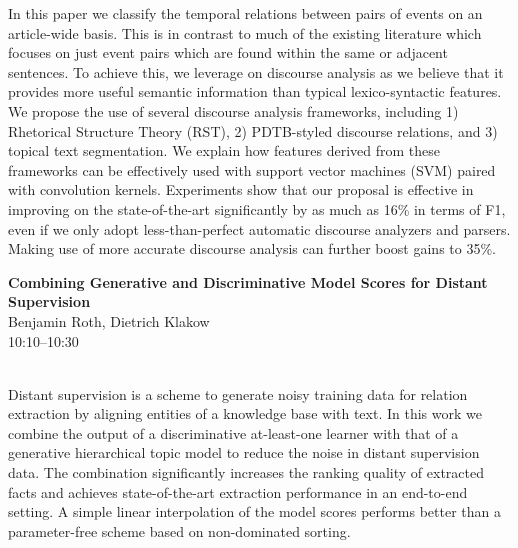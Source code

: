 \documentclass[twoside,makeidx]{book}
\begin{document}
\nopagebreak%
\noindent%
{\small In this paper we classify the temporal relations between pairs of events on an article-wide basis. This is in contrast to much of the existing literature which focuses on just event pairs which are found within the same or adjacent sentences. To achieve this, we leverage on discourse analysis as we believe that it provides more useful semantic information than typical lexico-syntactic features. We propose the use of several discourse analysis frameworks, including 1) Rhetorical Structure Theory (RST), 2) PDTB-styled discourse relations, and 3) topical text segmentation. We explain how features derived from these frameworks can be effectively used with support vector machines (SVM) paired with convolution kernels. Experiments show that our proposal is effective in improving on the state-of-the-art significantly by as much as 16\% in terms of F1, even if we only adopt less-than-perfect automatic discourse analyzers and parsers. Making use of more accurate discourse analysis can further boost gains to 35\%.}
\par\vspace{2em}\noindent%
\begin{minipage}{\linewidth}%
\begin{center}
\textbf{\normalsize Combining Generative and Discriminative Model Scores for Distant Supervision}\\
\normalsize  Benjamin Roth,  Dietrich Klakow\\
{\small 10:10--10:30}\\
\end{center}
\end{minipage}\\[0.5em]
\nopagebreak%
\noindent%
{\small Distant supervision is a scheme to generate noisy training data for relation extraction by aligning entities of a knowledge base with text. In this work we combine the output of a discriminative at-least-one learner with that of a generative hierarchical topic model to reduce the noise in distant supervision data. The combination significantly increases the ranking quality of extracted facts and achieves state-of-the-art extraction performance in an end-to-end setting. A simple linear interpolation of the model scores performs better than a parameter-free scheme based on non-dominated sorting.}
\clearpage
\end{document}

